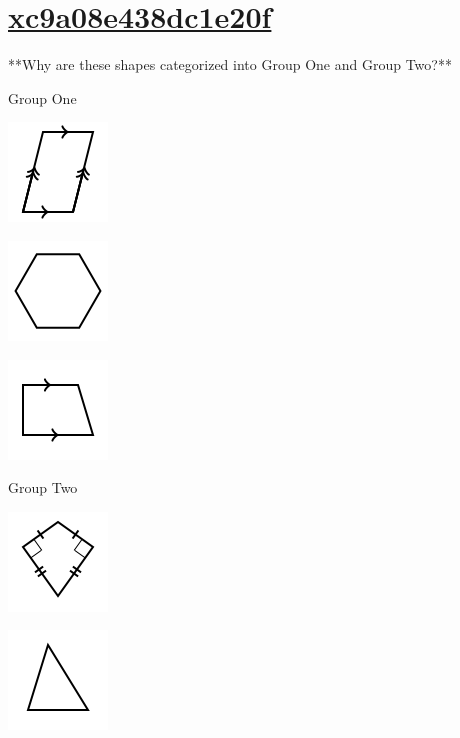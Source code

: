 \documentclass[twocolumn,10pt]{article}
\def\shrinkfactor{0.55}
\begin{document}
\section{\href{https://www.khanacademy.org/devadmin/content/items/xc9a08e438dc1e20f}{xc9a08e438dc1e20f}}

\noindent
**Why are these shapes categorized into Group One and Group Two?** 

Group One 


\includegraphics[scale=\shrinkfactor]{figures/feaa75a1e077e1d8ea6873bc2a4aa206d3c95598.png}

\includegraphics[scale=\shrinkfactor]{figures/0245164f3f4897772e76d361f955075a80732b03.png}

\includegraphics[scale=\shrinkfactor]{figures/53c957e1607d463070480943456fd8435ab45b5d.png}


Group Two


\includegraphics[scale=\shrinkfactor]{figures/be0b4c8e85edc438c12910c91d66875e8fcd2372.png}

\includegraphics[scale=\shrinkfactor]{figures/ee7f87a00acb47dec4f2b2eed9a6741b21afc47d.png}
\end{document}
